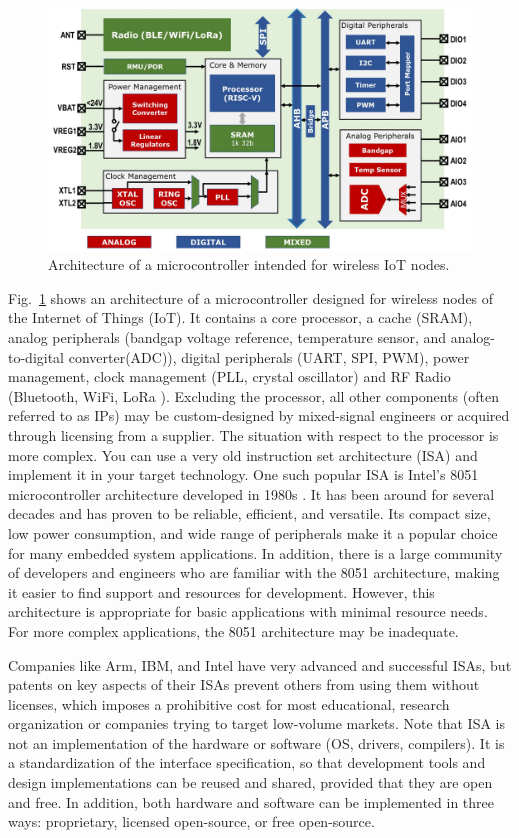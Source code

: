 \documentclass[journal]{IEEEtran}
\begin{document}
\begin{figure}[htb]
    \centering
    \includegraphics[width=0.95\linewidth]{image-uC.jpg}
    \caption{Architecture of a microcontroller intended for wireless IoT nodes.}
    \label{fig:uC}
\end{figure}

Fig.~\ref{fig:uC} shows an architecture of a microcontroller designed for wireless nodes of the Internet of Things (IoT). It contains a core processor, a cache (SRAM), analog peripherals (bandgap voltage reference, temperature sensor, and analog-to-digital converter(ADC)), digital peripherals (UART, SPI, PWM), power management, clock management (PLL, crystal oscillator) and RF Radio (Bluetooth, WiFi, LoRa \cite{sinha_survey_2017, bor_lora_2016}). Excluding the processor, all other components (often referred to as IPs) may be custom-designed by mixed-signal engineers or acquired through licensing from a supplier. The situation with respect to the processor is more complex. You can use a very old instruction set architecture (ISA) and implement it in your target technology. One such popular ISA is Intel's 8051 microcontroller architecture developed in 1980s \cite{noauthor_mcs-51_2023}. It has been around for several decades and has proven to be reliable, efficient, and versatile. Its compact size, low power consumption, and wide range of peripherals make it a popular choice for many embedded system applications. In addition, there is a large community of developers and engineers who are familiar with the 8051 architecture, making it easier to find support and resources for development. However, this architecture is appropriate for basic applications with minimal resource needs. For more complex applications, the 8051 architecture may be inadequate.

Companies like Arm, IBM, and Intel have very advanced and successful ISAs, but patents on key aspects of their ISAs prevent others from using them without licenses, which imposes a prohibitive cost for most educational, research organization or companies trying to target low-volume markets. 
Note that ISA is not an implementation of the hardware or software (OS, drivers, compilers). It is a standardization of the interface specification, so that development tools and design implementations can be reused and shared, provided that they are open and free. In addition, both hardware and software can be implemented in three ways: proprietary, licensed open-source, or free open-source.
\end{document}
